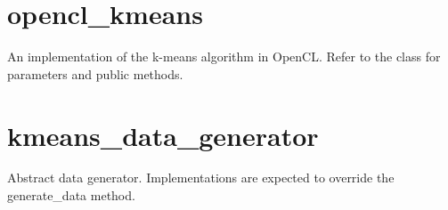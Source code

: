 \documentclass[letterpaper,10pt,english]{sphinxmanual}
\begin{document}
\section{opencl\_kmeans}
\label{kmeans:opencl-kmeans}

\begin{fulllineitems}
\label{kmeans:spscicomp.kmeans.extension.c_kmeans.opencl.opencl_kmeans.OpenCLKmeans}
An implementation of the k-means algorithm in OpenCL. Refer to the {\hyperref[kmeans:kmeans.DefaultKmeans]{}} class for parameters and
public methods.

\end{fulllineitems}



\section{kmeans\_data\_generator}
\label{kmeans:module-kmeans_data_generator}\label{kmeans:kmeans-data-generator}

\begin{fulllineitems}
\label{kmeans:kmeans_data_generator.KmeansDataGenerator}
Abstract data generator. Implementations are expected to override the generate\_data method.

\end{fulllineitems}

\end{document}
